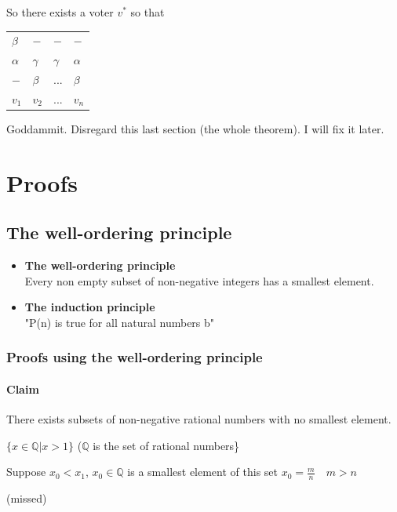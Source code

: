\documentclass[9pt, letterpaper, oneside]{article}
\begin{document}

So there exists a voter $v^*$ so that
\begin{tabular}{| l | l | l | l | }
  $\beta$ & $-$ & $-$  & $-$\\
  $\alpha$ & $\gamma$ & $\gamma$  & $\alpha$\\
  $-$ & $\beta$ & $...$  & $\beta$\\
  $v_1$ & $v_2$ & $...$  & $v_n$\\
\end{tabular}

Goddammit. Disregard this last section (the whole theorem). I will fix it later.

\section{Proofs}

\subsection{The well-ordering principle}
\begin{itemize}
	\item \textbf{The well-ordering principle} \\
	Every non empty subset of non-negative integers has a smallest element.
	\item \textbf{The induction principle}\\
	 "P(n) is true for all natural numbers b"
\end{itemize}

\subsubsection{Proofs using the well-ordering principle}

\paragraph{Claim}
There exists subsets of non-negative rational numbers with no smallest element.

$\{x \in \mathbb{Q} | x > 1\}$ ($\mathbb{Q}$ is the set of rational numbers\}

Suppose $x_0<x_1$, $x_0 \in \mathbb{Q}$ is a smallest element of this set $x_0 = \frac{m}{n} \quad m > n$

(missed)
\end{document}
